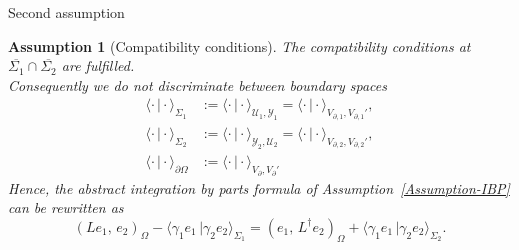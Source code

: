 \documentclass[aspectratio=169]{beamer}
\newcommand{\inner}[3][]{\ensuremath{( #2, \, #3 )_{#1}}}
\newcommand{\dualpr}[3][]{\ensuremath{\langle #2 \, \vert #3 \rangle_{#1}}}
\newtheorem{assumption}{Assumption}
\begin{document}
\begin{frame}{Second assumption}
	\begin{assumption}[Compatibility conditions]
		The compatibility conditions at $\overline{\Sigma_1} \cap \overline{\Sigma_2}$ are fulfilled. \\
		Consequently we do not discriminate between boundary spaces 
		\begin{equation*}
			\begin{aligned}
				\dualpr[\Sigma_1]{\cdot}{\cdot} &:= \dualpr[\mathcal{U}_1,\mathcal{Y}_1]{\cdot}{\cdot} = \dualpr[V_{\partial,1},V_{\partial,1}']{\cdot}{\cdot}, \\
				\dualpr[\Sigma_2]{\cdot}{\cdot} &:= \dualpr[\mathcal{Y}_2,\mathcal{U}_2]{\cdot}{\cdot}=  \dualpr[V_{\partial,2},V_{\partial,2}']{\cdot}{\cdot}, \\
				\dualpr[\partial\Omega]{\cdot}{\cdot} &:= \dualpr[V_\partial,V_\partial']{\cdot}{\cdot}
			\end{aligned}
		\end{equation*}
	Hence, the abstract integration by parts formula of Assumption~\ref{Assumption-IBP} can be  rewritten as
	\begin{equation}\label{eq:intbyparts-for-mixed}
		\inner[\Omega]{L e_1}{e_2} - \dualpr[\Sigma_1]{\gamma_1 e_1}{\gamma_2 e_2} 
		= \inner[\Omega]{e_1}{L^\dag e_2} + \dualpr[\Sigma_2]{\gamma_1 e_1}{\gamma_2 e_2}.
	\end{equation}
	\end{assumption}

\end{frame}
\end{document}
